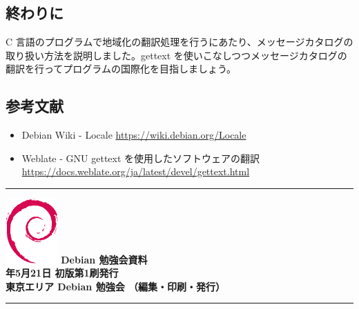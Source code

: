 \documentclass[mingoth,a4paper]{jsarticle}
\newcommand{\debmtgyear}{2022}
\newcommand{\debmtgmonth}{5}
\newcommand{\debmtgdate}{21}
\begin{document}
\subsection{終わりに}

C 言語のプログラムで地域化の翻訳処理を行うにあたり、メッセージカタログの取り扱い方法を説明しました。gettext を使いこなしつつメッセージカタログの翻訳を行ってプログラムの国際化を目指しましょう。

\subsection{参考文献}

\begin{itemize}
\item Debian Wiki - Locale \url{https://wiki.debian.org/Locale}
\item Weblate - GNU gettext を使用したソフトウェアの翻訳 \\ \url{https://docs.weblate.org/ja/latest/devel/gettext.html}
\end{itemize}
      
\mbox{}\newpage

\vspace*{15cm}
\hrule
\vspace{2mm}
\includegraphics[width=2cm]{image-assets/openlogo-nd.eps}
\noindent \Large \bf Debian 勉強会資料\\
\noindent \normalfont \debmtgyear{}年\debmtgmonth{}月\debmtgdate{}日 \hspace{5mm}  初版第1刷発行\\
\noindent \normalfont 東京エリア Debian 勉強会 （編集・印刷・発行）\\
\hrule
\end{document}
